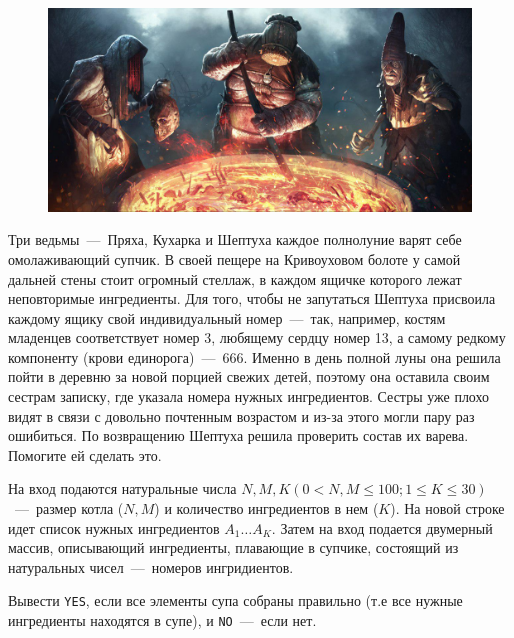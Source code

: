 \begin{figure}[h!]
	\centering
	\includegraphics[width=\linewidth, keepaspectratio]{soup.jpg}
\end{figure}

Три ведьмы~---~Пряха, Кухарка и Шептуха каждое полнолуние варят себе омолаживающий супчик. 
В своей пещере на Кривоуховом болоте у самой дальней стены стоит огромный стеллаж, в каждом ящичке которого лежат неповторимые ингредиенты. 
Для того, чтобы не запутаться Шептуха присвоила каждому ящику свой индивидуальный номер~---~так, например, 
костям младенцев соответствует номер 3, любящему сердцу номер 13, а самому редкому компоненту (крови единорога)~---~666. 
Именно в день полной луны она решила пойти в деревню за новой порцией свежих детей, поэтому она оставила своим сестрам записку, где указала номера нужных ингредиентов. 
Сестры уже плохо видят в связи с довольно почтенным возрастом и из-за этого могли пару раз ошибиться. 
По возвращению Шептуха решила проверить состав их варева. Помогите ей сделать это.

\InputFile
\noindent
На вход подаются натуральные числа $N, M, K (0 < N, M \leq 100; 1 \le K \leq 30)$~---~размер котла ($N, M$) и количество ингредиентов в нем ($K$).
На новой строке идет список нужных ингредиентов $A_1 \ldots A_K$.
Затем на вход подается двумерный массив, описывающий ингредиенты, плавающие в супчике, состоящий из натуральных чисел~---~номеров ингридиентов.


\OutputFile
\noindent

Вывести \texttt{YES}, если все элементы супа собраны правильно (т.е все нужные ингредиенты находятся в супе), и \texttt{NO}~---~если нет.

\SAMPLES